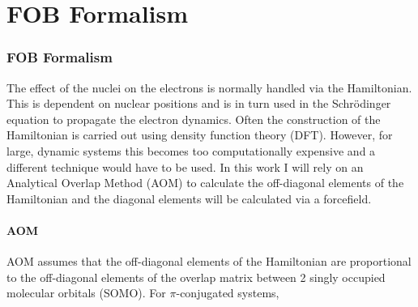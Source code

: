 \chapter{FOB Formalism}
\label{chap:FOB}
\subsection{FOB Formalism \label{sec:FOB-formalism}}
The effect of the nuclei on the electrons is normally handled via the Hamiltonian. This is dependent on nuclear positions and is in turn used in the Schr\"odinger equation to propagate the electron dynamics. Often the construction of the Hamiltonian is carried out using density function theory (DFT). However, for large, dynamic systems this becomes too computationally expensive and a different technique would have to be used. In this work I will rely on an Analytical Overlap Method (AOM) \cite{gajdos_ultrafast_2014} to calculate the off-diagonal elements of the Hamiltonian and the diagonal elements will be calculated via a forcefield.
\subsubsection{AOM}
AOM assumes that the off-diagonal elements of the Hamiltonian are proportional to the off-diagonal elements of the overlap matrix between 2 singly occupied molecular orbitals (SOMO). For $\pi$-conjugated systems,
